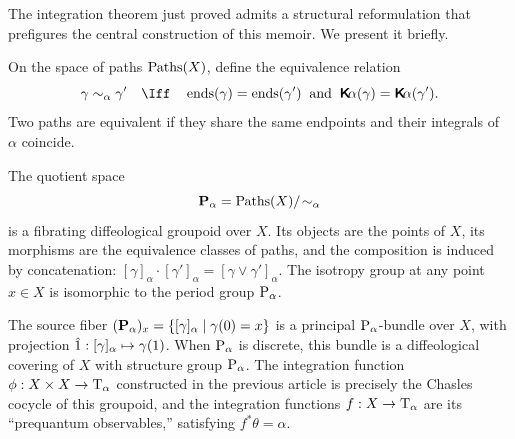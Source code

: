 \documentclass[10pt,reqno,letterpaper,twoside]{amsbook}
\begin{document}
  \begin{article}
    \label{art:groupoid-closed-1-form}
    The integration theorem just proved admits a structural reformulation
    that prefigures the central construction of this memoir.
    We present it briefly.
    
    On the space of paths $\operatorname{Paths}(X)$,
    define the equivalence relation
    \[
      \gamma \sim_\alpha \gamma'
      \qtext{\Iff}
      \EndsMap(\gamma) = \EndsMap(\gamma')
      \;\;\text{and}\;\;
      \Kalpha(\gamma) = \Kalpha(\gamma').
      \]%
    Two paths are equivalent if they share the same endpoints
    and their integrals of $\alpha$ coincide.
    
    \begin{proposition}
      The quotient space
      \[
        \mathbf{P}_\alpha = \operatorname{Paths}(X)/\!\sim_\alpha
        \]%
      is a fibrating diffeological groupoid over $X$.
      Its objects are the points of $X$,
      its morphisms are the equivalence classes of paths,
      and the composition is induced by concatenation:
      $[\gamma]_\alpha \cdot [\gamma']_\alpha = [\gamma \vee \gamma']_\alpha$.
      The isotropy group at any point $x \in X$ is isomorphic to the
      period group $\operatorname{P}_\alpha$.
    \end{proposition}
    
    The source fiber $(\mathbf{P}_\alpha)_x = \{ [\gamma]_\alpha \mid \gamma(0) = x \}$
    is a principal $\operatorname{P}_\alpha$-bundle over $X$,
    with projection $\hat 1: [\gamma]_\alpha \mapsto \gamma(1)$.
    When $\operatorname{P}_\alpha$ is discrete,
    this bundle is a diffeological covering of $X$ with structure group
    $\operatorname{P}_\alpha$.
    The integration function $\phi: X \times X \to \mathrm{T}_\alpha$ constructed
    in the previous article is precisely the Chasles cocycle of this groupoid,
    and the integration functions $f: X \to \mathrm{T}_\alpha$ are its
    ``prequantum observables,''
    satisfying $f^*\theta = \alpha$.
    

\end{article}
\end{document}

